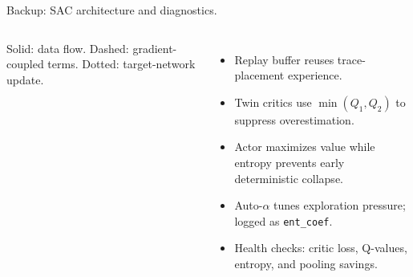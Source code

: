 \documentclass[11pt,aspectratio=43]{beamer}
\begin{document}
\begin{frame}[shrink=6]{Backup: SAC architecture and diagnostics.}
\begin{columns}[T,onlytextwidth]
      \vspace{0.2em}
      \scriptsize Solid: data flow. Dashed: gradient-coupled terms.
      Dotted: target-network update.

      \vspace{0.2em}
      \begin{itemize}
        \setlength{\itemsep}{0.42em}
        \item Replay buffer reuses trace-placement experience.
        \item Twin critics use $\min(Q_1,Q_2)$ to suppress overestimation.
        \item Actor maximizes value while entropy prevents early deterministic collapse.
        \item Auto-$\alpha$ tunes exploration pressure; logged as \texttt{ent\_coef}.
        \item Health checks: critic loss, Q-values, entropy, and pooling savings.
      \end{itemize}

  \end{columns}

\end{frame}
\end{document}
